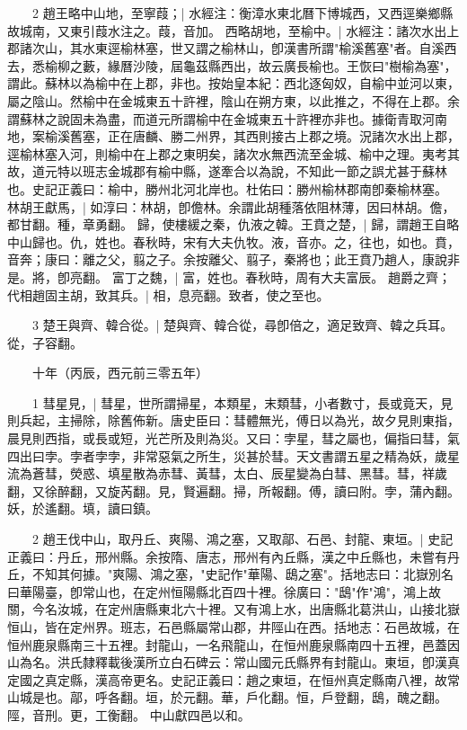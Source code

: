 　　2 趙王略中山地，至寧葭；|{
	水經注：衡漳水東北曆下博城西，又西逕樂鄉縣故城南，又東引葭水注之。葭，音加。
	}
西略胡地，至榆中。|{
	水經注：諸次水出上郡諸次山，其水東逕榆林塞，世又謂之榆林山，卽漢書所謂"榆溪舊塞"者。自溪西去，悉榆柳之藪，緣曆沙陵，屆龜茲縣西出，故云廣長榆也。王恢曰"樹榆為塞"，謂此。蘇林以為榆中在上郡，非也。按始皇本紀：西北逐匈奴，自榆中並河以東，屬之陰山。然榆中在金城東五十許裡，陰山在朔方東，以此推之，不得在上郡。余謂蘇林之說固未為盡，而道元所謂榆中在金城東五十許裡亦非也。據衛青取河南地，案榆溪舊塞，正在唐麟、勝二州界，其西則接古上郡之境。況諸次水出上郡，逕榆林塞入河，則榆中在上郡之東明矣，諸次水無西流至金城、榆中之理。夷考其故，道元特以班志金城郡有榆中縣，遂牽合以為說，不知此一節之誤尤甚于蘇林也。史記正義曰：榆中，勝州北河北岸也。杜佑曰：勝州榆林郡南卽秦榆林塞。
	}
林胡王獻馬，|{
	如淳曰：林胡，卽儋林。余謂此胡種落依阻林薄，因曰林胡。儋，都甘翻。種，章勇翻。
	}
歸，使樓緩之秦，仇液之韓。王賁之楚，|{
	歸，謂趙王自略中山歸也。仇，姓也。春秋時，宋有大夫仇牧。液，音亦。之，往也，如也。賁，音奔；康曰：離之父，翦之子。余按離父、翦子，秦將也；此王賁乃趙人，康說非是。將，卽亮翻。
	}
富丁之魏，|{
	富，姓也。春秋時，周有大夫富辰。
	}
趙爵之齊；代相趙固主胡，致其兵。|{
	相，息亮翻。致者，使之至也。
	}

　　3 楚王與齊、韓合從。|{
	楚與齊、韓合從，尋卽倍之，適足致齊、韓之兵耳。從，子容翻。
	}

　　十年（丙辰，西元前三零五年）

　　1 彗星見，|{
	彗星，世所謂掃星，本類星，末類彗，小者數寸，長或竟天，見則兵起，主掃除，除舊佈新。唐史臣曰：彗體無光，傅日以為光，故夕見則東指，晨見則西指，或長或短，光芒所及則為災。又曰：孛星，彗之屬也，偏指曰彗，氣四出曰孛。孛者孛孛，非常惡氣之所生，災甚於彗。天文書謂五星之精為妖，歲星流為蒼彗，熒惑、填星散為赤彗、黃彗，太白、辰星變為白彗、黑彗。彗，祥歲翻，又徐醉翻，又旋芮翻。見，賢遍翻。掃，所報翻。傅，讀曰附。孛，蒲內翻。妖，於遙翻。填，讀曰鎮。
	}

　　2 趙王伐中山，取丹丘、爽陽、鴻之塞，又取鄗、石邑、封龍、東垣。|{
	史記正義曰：丹丘，邢州縣。余按隋、唐志，邢州有內丘縣，漢之中丘縣也，未嘗有丹丘，不知其何據。"爽陽、鴻之塞，"史記作"華陽、鴟之塞"。括地志曰：北嶽別名曰華陽臺，卽常山也，在定州恒陽縣北百四十裡。徐廣曰："鴟"作"鴻"，鴻上故關，今名汝城，在定州唐縣東北六十裡。又有鴻上水，出唐縣北葛洪山，山接北嶽恒山，皆在定州界。班志，石邑縣屬常山郡，井陘山在西。括地志：石邑故城，在恒州鹿泉縣南三十五裡。封龍山，一名飛龍山，在恒州鹿泉縣南四十五裡，邑蓋因山為名。洪氏隸釋載後漢所立白石碑云：常山國元氏縣界有封龍山。東垣，卽漢真定國之真定縣，漢高帝更名。史記正義曰：趙之東垣，在恒州真定縣南八裡，故常山城是也。鄗，呼各翻。垣，於元翻。華，戶化翻。恒，戶登翻，鴟，醜之翻。陘，音刑。更，工衡翻。
	}
中山獻四邑以和。

